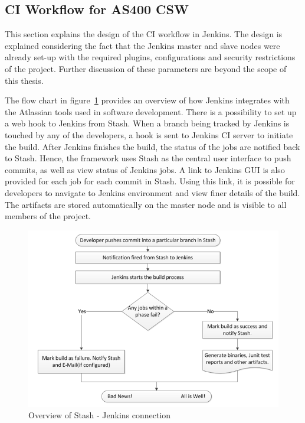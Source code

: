 \documentclass[12pt, a4paper, titlepage]{scrartcl}
\begin{document}
\subsection{CI Workflow for AS400 CSW}
\par This section explains the design of the CI workflow in Jenkins. The design is explained considering the fact that the Jenkins master and slave nodes were already set-up with the required plugins, configurations and security restrictions of the project. Further discussion of these parameters are beyond the scope of this thesis.
\par The flow chart in figure~\ref{fig:stash-jenkins-workflow} provides an overview of how Jenkins integrates with the Atlassian tools used in software development. There is a possibility to set up  a web hook to Jenkins from Stash. When a branch being tracked by Jenkins is touched by any of the developers, a hook is sent to Jenkins CI server to initiate the build. After Jenkins finishes the build, the status of the jobs are notified back to Stash. Hence, the framework uses Stash as the central user interface to push commits, as well as view status of Jenkins jobs. A link to Jenkins GUI is also provided for each job for each commit in Stash. Using this link, it is possible for developers to navigate to Jenkins environment and view finer details of the build. The artifacts are stored automatically on the master node and is visible to all members of the project. 
\begin{figure}[!ht]
\centering
\includegraphics[width=\textwidth]{jenkins-workflow.png}
\caption{Overview of Stash - Jenkins connection}
\label{fig:stash-jenkins-workflow}
\end{figure}
\end{document}
